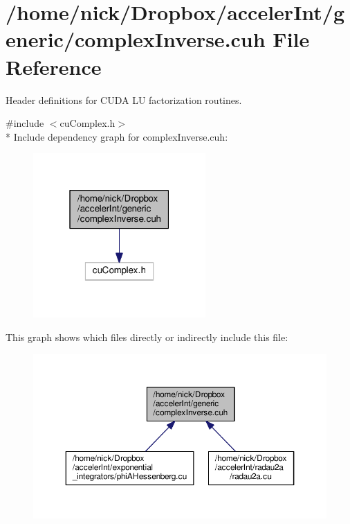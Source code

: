 \hypertarget{complexInverse_8cuh}{}\section{/home/nick/\+Dropbox/acceler\+Int/generic/complex\+Inverse.cuh File Reference}
\label{complexInverse_8cuh}


Header definitions for C\+U\+DA LU factorization routines.  


{\ttfamily \#include $<$cu\+Complex.\+h$>$}\\*
Include dependency graph for complex\+Inverse.\+cuh\+:
\nopagebreak
\begin{figure}[H]
\begin{center}
\leavevmode
\includegraphics[width=187pt]{complexInverse_8cuh__incl}
\end{center}
\end{figure}
This graph shows which files directly or indirectly include this file\+:
\nopagebreak
\begin{figure}[H]
\begin{center}
\leavevmode
\includegraphics[width=350pt]{complexInverse_8cuh__dep__incl}
\end{center}
\end{figure}
